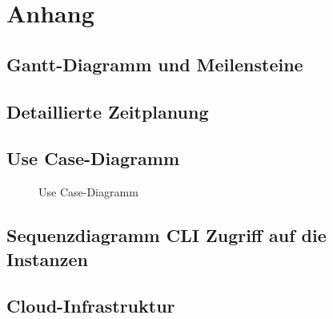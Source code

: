 \section{Anhang}
\label{sec:Anhang}
\subsection{Gantt-Diagramm und Meilensteine}
\label{app:Gantt}
\clearpage

\subsection{Detaillierte Zeitplanung}
\label{app:Zeitplanung}
\clearpage

\subsection{Use Case-Diagramm}
\label{app:UseCase}
\begin{figure}[htb]
\centering
% 
\caption{Use Case-Diagramm}
\end{figure}
\clearpage

\subsection{Sequenzdiagramm CLI Zugriff auf die Instanzen}
\label{app:Sequenzdiagramm CLI Zugriff auf die Instanzen}

\subsection{Cloud-Infrastruktur}
\label{app:Cloud-Infrastruktur}

